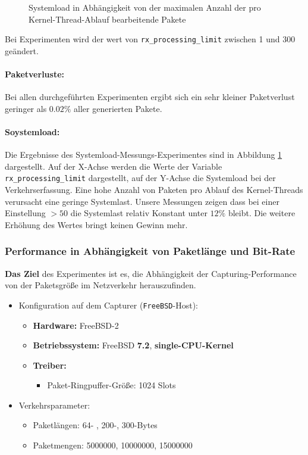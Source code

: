 {\begin{figure}
\caption{Systemload in Abhängigkeit von der maximalen Anzahl der pro Kernel-Thread-Ablauf
bearbeitende Pakete}
\label{img:plot_sysload_kts}
\end{figure} 
Bei Experimenten wird der wert von \verb+rx_processing_limit+ zwischen 1 und 300 
geändert.
\paragraph*{Paketverluste:} 
Bei allen durchgeführten Experimenten ergibt sich ein sehr kleiner Paketverlust
geringer als $0.02\%$ aller generierten Pakete.
\paragraph*{Soystemload:}
Die Ergebnisse des Systemload-Messungs-Experimentes sind in Abbildung
\ref{img:plot_sysload_kts} dargestellt.  Auf der X-Achse werden die Werte der
Variable \verb+rx_processing_limit+ dargestellt, auf der Y-Achse die Systemload
bei der Verkehrserfassung. Eine hohe Anzahl von Paketen pro Ablauf des
Kernel-Threads verursacht eine geringe Systemlast. Unsere Messungen zeigen dass
bei einer Einstellung $>50$ die Systemlast relativ Konstant unter $12\%$ bleibt. 
Die weitere Erhöhung des Wertes bringt keinen Gewinn mehr.
}
\subsubsection*{Performance in Abhängigkeit von Paketlänge und Bit-Rate}
\textbf{Das Ziel} des Experimentes ist es, die Abhängigkeit der
Capturing-Performance von der Paketsgröße im Netzverkehr
herauszufinden.
%
\begin{itemize}
\item Konfiguration auf dem Capturer (\verb+FreeBSD+-Host): 
\begin{itemize}
	\item \textbf{Hardware:} FreeBSD-2
	\item \textbf{Betriebssystem:} FreeBSD \textbf{7.2}, \textbf{single-CPU-Kernel}
	\item \textbf{Treiber:} 
		\begin{itemize}
			\item Paket-Ringpuffer-Größe: 1024 Slots
		\end{itemize}
\end{itemize}
\item Verkehrsparameter:
\begin{itemize}
	\item Paketlängen: 64- , 200-, 300-Bytes
	\item Paketmengen: 5000000, 10000000, 15000000
\end{itemize}
\end{itemize}
%
